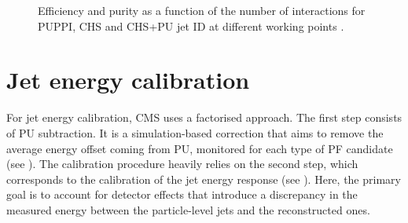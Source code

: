 \documentclass[a4paper,11pt]{article}
\begin{document}
\begin{figure}[htb]
\centering
{}
\caption{Efficiency and purity as a function of the number of interactions for PUPPI, CHS and CHS+PU jet ID at different working points \citep{Puppi}.}
\label{fig:PuppiEffPurity}
\end{figure}



\section{Jet energy calibration}

For jet energy calibration, CMS uses a factorised approach. The first step consists of PU subtraction. It is a simulation-based correction that aims to remove the average energy offset coming from PU, monitored for each type of PF candidate (see ). The calibration procedure heavily relies on the second step, which corresponds to the calibration of the jet energy response (see ). Here, the primary goal is to account for detector effects that introduce a discrepancy in the measured energy between the particle-level jets and the reconstructed ones.
\end{document}
